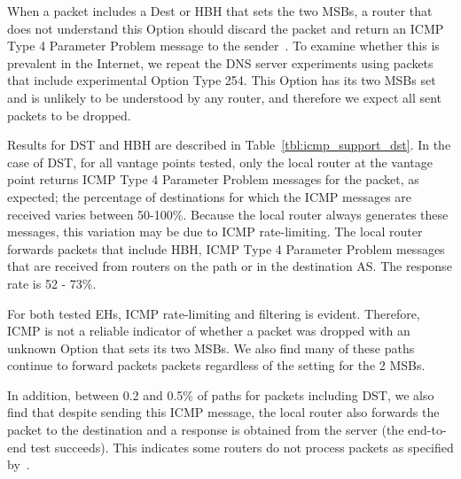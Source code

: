 \documentclass[conference]{IEEEtran}
\begin{document}
When a packet includes a Dest or HBH that sets the two MSBs, a router that does not understand this Option should discard the packet and return an ICMP Type 4 Parameter Problem message to the sender~\cite{RFC8200}. To examine whether this is prevalent in the Internet, we repeat the DNS server experiments using packets that include experimental Option Type 254. This Option has its two MSBs set and is unlikely to be understood by any router, and therefore we expect all sent packets to be dropped.

Results for DST and HBH are described in Table~\ref{tbl:icmp_support_dst}.
In the case of DST, for all vantage points tested, only the local router at the vantage point returns ICMP Type 4 Parameter Problem messages for the packet, as expected; the percentage of destinations for which the ICMP messages are received varies between 50-100\%. Because the local router always generates these messages, this variation may be due to ICMP rate-limiting. 
The local router forwards packets that include HBH,  ICMP Type 4 Parameter Problem messages that are received from routers on the path or in the destination AS. The response rate is 52 - 73\%. 

For both tested EHs, ICMP rate-limiting and filtering is evident. Therefore, ICMP is not a reliable indicator of whether a packet was dropped with an unknown Option that sets its two MSBs. We also find many of these paths continue to forward packets packets regardless of the setting for the 2 MSBs.

In addition, between 0.2 and 0.5\% of paths for packets including DST, we also find that despite sending this ICMP message, the local router also forwards the packet to the destination and a response is  obtained from the server (the end-to-end test succeeds). This indicates some routers do not process packets as specified by~\cite{RFC8200}.
\end{document}
